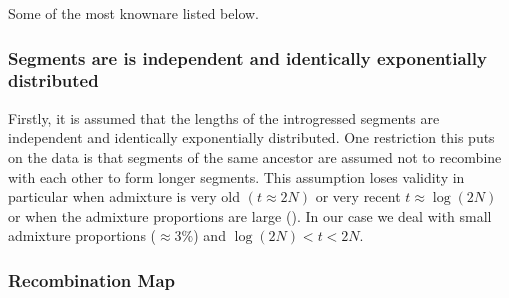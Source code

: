 \documentclass[]{article}
\begin{document}
Some of the most knownare listed below.

\subsubsection{Segments are is independent and identically exponentially
distributed}\label{segments-are-is-independent-and-identically-exponentially-distributed}

Firstly, it is assumed that the lengths of the introgressed segments are
independent and identically exponentially distributed. One restriction
this puts on the data is that segments of the same ancestor are assumed
not to recombine with each other to form longer segments. This
assumption loses validity in particular when admixture is very old
\((t \approx 2N)\) or very recent \(t \approx \log(2N)\) or when the
admixture proportions are large (\cite{liang_lengths_2014}). In our case
we deal with small admixture proportions (\(\approx3 \%\)) and
\(\log(2N) < t < 2N\).

\subsubsection{Recombination Map}\label{recombination-map}
\end{document}
